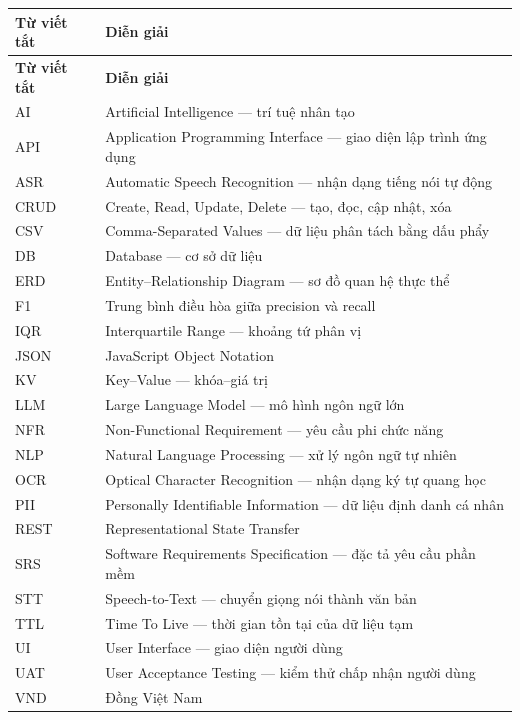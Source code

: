 
\begin{longtable}{@{}L{2.8cm}L{11.5cm}@{}}
  \toprule
  \textbf{Từ viết tắt} & \textbf{Diễn giải} \\
  \midrule
  \endfirsthead
  \toprule
  \textbf{Từ viết tắt} & \textbf{Diễn giải} \\
  \midrule
  \endhead
  AI & Artificial Intelligence --- trí tuệ nhân tạo \\
  API & Application Programming Interface --- giao diện lập trình ứng dụng \\
  ASR & Automatic Speech Recognition --- nhận dạng tiếng nói tự động \\
  CRUD & Create, Read, Update, Delete --- tạo, đọc, cập nhật, xóa \\
  CSV & Comma-Separated Values --- dữ liệu phân tách bằng dấu phẩy \\
  DB & Database --- cơ sở dữ liệu \\
  ERD & Entity--Relationship Diagram --- sơ đồ quan hệ thực thể \\
  F1 & Trung bình điều hòa giữa precision và recall \\
  IQR & Interquartile Range --- khoảng tứ phân vị \\
  JSON & JavaScript Object Notation \\
  KV & Key--Value --- khóa--giá trị \\
  LLM & Large Language Model --- mô hình ngôn ngữ lớn \\
  NFR & Non-Functional Requirement --- yêu cầu phi chức năng \\
  NLP & Natural Language Processing --- xử lý ngôn ngữ tự nhiên \\
  OCR & Optical Character Recognition --- nhận dạng ký tự quang học \\
  PII & Personally Identifiable Information --- dữ liệu định danh cá nhân \\
  REST & Representational State Transfer \\
  SRS & Software Requirements Specification --- đặc tả yêu cầu phần mềm \\
  STT & Speech-to-Text --- chuyển giọng nói thành văn bản \\
  TTL & Time To Live --- thời gian tồn tại của dữ liệu tạm \\
  UI & User Interface --- giao diện người dùng \\
  UAT & User Acceptance Testing --- kiểm thử chấp nhận người dùng \\
  VND & Đồng Việt Nam \\
  \bottomrule
\end{longtable}
